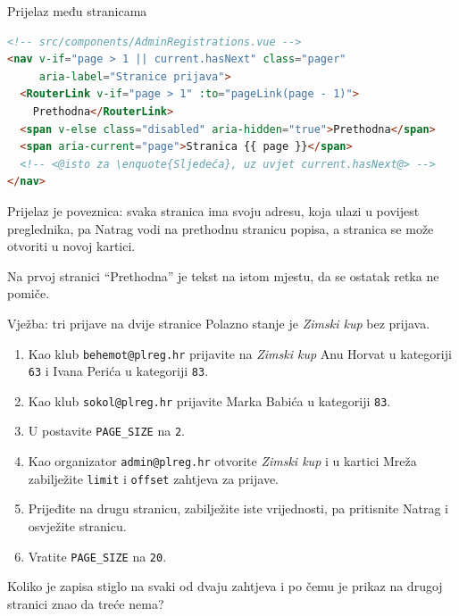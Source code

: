 \begin{frame}[fragile]{Prijelaz među stranicama}
\begin{lstlisting}[language=html]
<!-- src/components/AdminRegistrations.vue -->
<nav v-if="page > 1 || current.hasNext" class="pager"
     aria-label="Stranice prijava">
  <RouterLink v-if="page > 1" :to="pageLink(page - 1)">
    Prethodna</RouterLink>
  <span v-else class="disabled" aria-hidden="true">Prethodna</span>
  <span aria-current="page">Stranica {{ page }}</span>
  <!-- <@isto za \enquote{Sljedeća}, uz uvjet current.hasNext@> -->
</nav>
\end{lstlisting}

\vspace{0.3em}
Prijelaz je poveznica: svaka stranica ima svoju adresu, koja ulazi u povijest preglednika, pa Natrag vodi na prethodnu stranicu popisa, a stranica se može otvoriti u novoj kartici.

\vspace{0.3em}
Na prvoj stranici \enquote{Prethodna} je tekst na istom mjestu, da se ostatak retka ne pomiče.
\end{frame}

\begin{frame}{Vježba: tri prijave na dvije stranice}
Polazno stanje je \emph{Zimski kup} bez prijava.

\vspace{0.6em}
\begin{enumerate}
  \itemsep0.35em
  \item Kao klub \texttt{behemot@plreg.hr} prijavite na \emph{Zimski kup} Anu Horvat u kategoriji \texttt{63} i Ivana Perića u kategoriji \texttt{83}.
  \item Kao klub \texttt{sokol@plreg.hr} prijavite Marka Babića u kategoriji \texttt{83}.
  \item U  postavite \texttt{PAGE\_SIZE} na \texttt{2}.
  \item Kao organizator \texttt{admin@plreg.hr} otvorite \emph{Zimski kup} i u kartici Mreža zabilježite \texttt{limit} i \texttt{offset} zahtjeva za prijave.
  \item Prijeđite na drugu stranicu, zabilježite iste vrijednosti, pa pritisnite Natrag i osvježite stranicu.
  \item Vratite \texttt{PAGE\_SIZE} na \texttt{20}.
\end{enumerate}

\vspace{0.6em}
Koliko je zapisa stiglo na svaki od dvaju zahtjeva i po čemu je prikaz na drugoj stranici znao da treće nema?
\end{frame}

